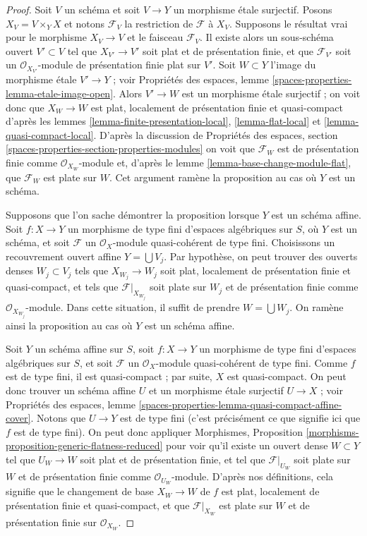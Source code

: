 \begin{proof}
Soit $V$ un schéma et soit $V \to Y$ un morphisme étale surjectif.
Posons $X_V = V \times_Y X$ et notons $\mathcal{F}_V$ la restriction de
$\mathcal{F}$ à $X_V$. Supposons le résultat vrai pour le morphisme
$X_V \to V$ et le faisceau $\mathcal{F}_V$. Il existe alors un sous-schéma ouvert
$V' \subset V$ tel que $X_{V'} \to V'$ soit plat et de présentation finie,
et que $\mathcal{F}_{V'}$ soit un $\mathcal{O}_{X_{V'}}$-module de
présentation finie plat sur $V'$. Soit $W \subset Y$ l'image du
morphisme étale $V' \to Y$ ; voir
Propriétés des espaces, lemme \ref{spaces-properties-lemma-etale-image-open}.
Alors $V' \to W$ est un morphisme étale surjectif ; on voit donc que
$X_W \to W$ est plat, localement de présentation finie et quasi-compact d'après les
lemmes \ref{lemma-finite-presentation-local},
\ref{lemma-flat-local} et
\ref{lemma-quasi-compact-local}.
D'après la discussion de
Propriétés des espaces, section
\ref{spaces-properties-section-properties-modules}
on voit que $\mathcal{F}_W$ est de présentation finie comme
$\mathcal{O}_{X_W}$-module et, d'après le
lemme \ref{lemma-base-change-module-flat},
que $\mathcal{F}_W$ est plate sur $W$. Cet argument
ramène la proposition au cas où $Y$ est un schéma.

\medskip\noindent
Supposons que l'on sache démontrer la proposition lorsque $Y$ est un schéma affine.
Soit $f : X \to Y$ un morphisme de type fini d'espaces algébriques
sur $S$, où $Y$ est un schéma, et soit $\mathcal{F}$ un $\mathcal{O}_X$-module
quasi-cohérent de type fini. Choisissons un recouvrement ouvert affine
$Y = \bigcup V_j$. Par hypothèse, on peut trouver des ouverts denses $W_j \subset V_j$
tels que $X_{W_j} \to W_j$ soit plat, localement de présentation finie et
quasi-compact, et tels que $\mathcal{F}|_{X_{W_j}}$ soit plate sur $W_j$
et de présentation finie comme $\mathcal{O}_{X_{W_j}}$-module. Dans cette
situation, il suffit de prendre $W = \bigcup W_j$. On ramène ainsi
la proposition au cas où $Y$ est un schéma affine.

\medskip\noindent
Soit $Y$ un schéma affine sur $S$, soit
$f : X \to Y$ un morphisme de type fini d'espaces algébriques
sur $S$, et soit $\mathcal{F}$ un $\mathcal{O}_X$-module quasi-cohérent
de type fini. Comme $f$ est de type fini,
il est quasi-compact ; par suite, $X$ est quasi-compact. On peut donc trouver
un schéma affine $U$ et un morphisme étale surjectif $U \to X$ ; voir
Propriétés des espaces, lemme
\ref{spaces-properties-lemma-quasi-compact-affine-cover}.
Notons que $U \to Y$ est de type fini (c'est précisément ce que signifie ici
que $f$ est de type fini). On peut donc appliquer
Morphismes, Proposition \ref{morphisms-proposition-generic-flatness-reduced}
pour voir qu'il existe un ouvert dense $W \subset Y$ tel que
$U_W \to W$ soit plat et de présentation finie, et tel que
$\mathcal{F}|_{U_W}$ soit plate sur $W$ et de présentation finie
comme $\mathcal{O}_{U_W}$-module. D'après nos définitions, cela signifie que
le changement de base $X_W \to W$ de $f$ est plat, localement de présentation finie
et quasi-compact, et que $\mathcal{F}|_{X_W}$ est plate sur $W$ et de
présentation finie sur $\mathcal{O}_{X_W}$.
\end{proof}

